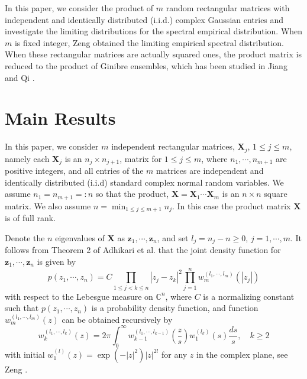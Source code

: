 \documentclass[12pt]{article}
\theoremstyle{plain}
\theoremstyle{definition}
\theoremstyle{remark}
\begin{document}
In this paper, we consider the product of $m$ random rectangular matrices with independent and identically distributed (i.i.d.) complex Gaussian entries and investigate the limiting distributions for the spectral empirical distribution. When $m$ is fixed integer, Zeng \cite{zeng2016} obtained the limiting empirical spectral distribution. When these rectangular matrices are actually squared ones, the product matrix is reduced to the product of Ginibre ensembles, which has been studied in Jiang and Qi \cite{JiangQi2019}. 


\section{Main Results}\label{sec:main}
In this paper, we consider $m$ independent rectangular matrices, $\mathbf{X}_j$, $1\leq j \leq m$, namely each $\mathbf{X}_j$ is an $n_j\times n_{j+1}$, matrix for $1\leq j\leq m$, where $n_1,\cdots, n_{m+1}$ are positive integers, and all entries of the $m$ matrices are independent and identically distributed (i.i.d) standard complex normal random variables. We assume $n_1=n_{m+1}=:n$ so that the product, $\mathbf{X}=\mathbf{X}_1 \cdots \mathbf{X}_{m}$ is an $n\times n$ square matrix. We also assume $n=\min_{1\leq j\leq m+1}n_j$. In this case the product matrix $\mathbf{X}$ is of full rank. 

Denote the $n$ eigenvalues of $\mathbf{X}$ as $\mathbf{z}_{1}, \cdots, \mathbf{z}_{n}$, and set $l_{j}=n_{j}-n\geq 0$, $j=1, \cdots, m$. It follows from Theorem 2 of Adhikari et al. \cite{Adhikari} that the joint density function for $\mathbf{z}_{1}, \cdots, \mathbf{z}_{n}$ is given by 
\begin{equation*}
p\left({z}_{1}, \cdots, {z}_{n}\right)=C \prod_{1 \leq j<k \leq n}\left|{z}_{j}-{z}_{k}\right|^{2} \prod_{j=1}^{n} w_{m}^{\left(l_{1}, \cdots, l_{m}\right)}\left(\left|z_{j}\right|\right)
\end{equation*}
with respect to the Lebesgue measure on $\mathbb{C}^{n}$, where $C$ is a normalizing constant such that $p(z_1,\cdots, z_n)$ is a probability density function, and function $w_{m}^{\left(l_{1}, \cdots, l_{m}\right)}(z)$
can be obtained recursively by 
\begin{equation*}
w_{k}^{\left(l_{1}, \cdots, l_{k}\right)}(z)=2 \pi \int_{0}^{\infty} w_{k-1}^{\left(l_{1}, \cdots, l_{k-1}\right)}\left(\frac{z}{s}\right) w_{1}^{\left(l_{k}\right)}(s) \frac{d s}{s}, \quad k \geq 2
\end{equation*}
with initial $w_{1}^{(l)}(z)=\exp \left(-|z|^{2}\right)|z|^{2 l}$ for any $z$ in the complex plane, see Zeng \cite{zeng2016}.
\end{document}
